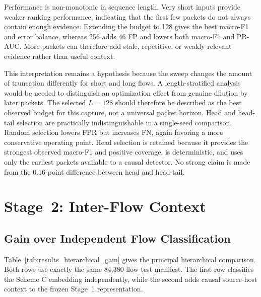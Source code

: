 \documentclass[11pt,fleqn]{report}
\begin{document}
Performance is non-monotonic in sequence length. Very short inputs provide
weaker ranking performance, indicating that the first few packets do not always
contain enough evidence. Extending the budget to 128 gives the best macro-F1
and error balance, whereas 256 adds 46 FP and lowers both macro-F1 and PR-AUC.
More packets can therefore add stale, repetitive, or weakly relevant evidence
rather than useful context.

This interpretation remains a hypothesis because the sweep changes the amount
of truncation differently for short and long flows. A length-stratified analysis
would be needed to distinguish an optimization effect from genuine dilution by
later packets. The selected $L=128$ should therefore be described as the best
observed budget for this capture, not a universal packet horizon.
Head and head-tail selection are practically indistinguishable in a single-seed
comparison. Random selection lowers FPR but increases FN, again favoring a more
conservative operating point. Head selection is retained because it provides
the strongest observed macro-F1 and positive coverage, is deterministic, and
uses only the earliest packets available to a causal detector. No strong claim
is made from the 0.16-point difference between head and head-tail.
\section{Stage~2: Inter-Flow Context}
\label{subsec:results_stage2}

\subsection{Gain over Independent Flow Classification}
\label{subsubsec:results_hierarchical_gain}

Table~\ref{tab:results_hierarchical_gain} gives the principal hierarchical
comparison. Both rows use exactly the same 84,380-flow test manifest. The first
row classifies the Scheme C embedding independently, while the second adds
causal source-host context to the frozen Stage~1 representation.

\begin{table}[H]
    \centering
    \caption{Independent Stage~1 classification and the complete hierarchical
    system on the common full-data manifest.}
    \label{tab:results_hierarchical_gain}
\end{table}
\end{document}
